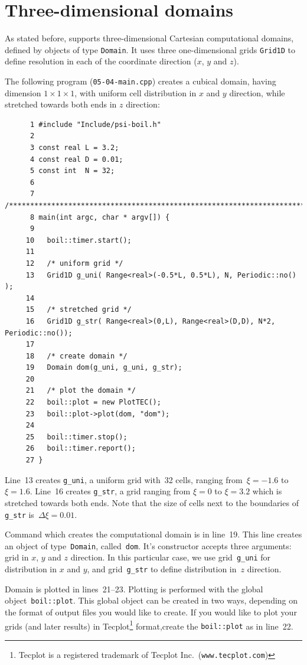 \section{Three-dimensional domains}
\label{sec_domains}

As stated before, {\psiboil} supports three-dimensional Cartesian
computational domains, defined by objects of type {\tt Domain}. 
It uses three one-dimensional grids {\tt Grid1D} to define 
resolution in each of the coordinate direction ($x$, $y$ and $z$).

The following program ({\tt 05-04-main.cpp}) creates a cubical domain, 
having dimension $1 \times 1 \times 1$, with uniform cell distribution 
in $x$ and $y$ direction, while stretched towards both ends in $z$ 
direction: 
%
{\small \begin{verbatim}
      1 #include "Include/psi-boil.h"
      2
      3 const real L = 3.2;
      4 const real D = 0.01;
      5 const int  N = 32;
      6
      7 /****************************************************************************/
      8 main(int argc, char * argv[]) {
      9
     10   boil::timer.start();
     11
     12   /* uniform grid */
     13   Grid1D g_uni( Range<real>(-0.5*L, 0.5*L), N, Periodic::no() );
     14
     15   /* stretched grid */
     16   Grid1D g_str( Range<real>(0,L), Range<real>(D,D), N*2, Periodic::no());
     17
     18   /* create domain */
     19   Domain dom(g_uni, g_uni, g_str);
     20
     21   /* plot the domain */
     22   boil::plot = new PlotTEC();
     23   boil::plot->plot(dom, "dom");
     24
     25   boil::timer.stop();
     26   boil::timer.report();
     27 }
\end{verbatim}}
%
Line~13 creates {\tt g\_uni}, a uniform grid with~32 cells, ranging 
from~$\xi=-1.6$ to $\xi=1.6$. Line~16 creates {\tt g\_str}, a grid ranging from 
$\xi=0$ to $\xi=3.2$ which is stretched towards both ends. Note that the size of
cells next to the boundaries of {\tt g\_str} is~$\Delta \xi = 0.01$. 

Command which creates the computational domain is in line~19. This line creates
an object of type~{\tt Domain}, called~{\tt dom}. It's constructor accepts three
arguments: grid in $x$, $y$ and $z$ direction. In this particular case, we use
grid~{\tt g\_uni} for distribution in $x$ and $y$, and grid~{\tt g\_str} to
define distribution in~$z$ direction.

Domain is plotted in lines~21--23. Plotting is performed with the global {\psiboil}
object~{\tt boil::plot}. This global object can be created in two ways, depending
on the format of output files you would like to create. If you would like to plot
your grids (and later results) in Tecplot\footnote{Tecplot is a registered trademark
of Tecplot Inc.\ ({\tt www.tecplot.com})} format,create the {\tt boil::plot} as 
in line~22.

